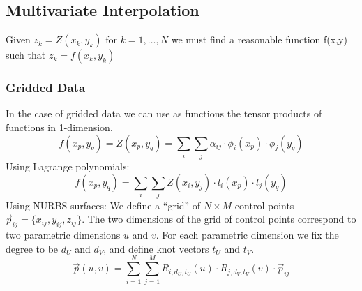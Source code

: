 \documentclass[8pt,a4paper]{scrartcl}
\begin{document}
\begin{multicols*}{3}

\subsection{Multivariate Interpolation}

Given $z_k = Z(x_k,y_k)$ for $k = 1,\dots,N$ we must find a reasonable function f(x,y) such that $z_k = f(x_k,y_k)$

\subsubsection{Gridded Data}

In the case of gridded data we can use as functions the tensor products of functions in 1-dimension.
\begin{equation*}
f(x_p,y_q) = Z(x_p,y_q) = \sum_i \sum_j \alpha_{ij} \cdot \phi_i(x_p) \cdot \phi_j(y_q)
\end{equation*}
Using Lagrange polynomials:
\begin{equation*}
f(x_p,y_q) = \sum_i \sum_j Z(x_i,y_j) \cdot l_i(x_p)\cdot  l_j(y_q)
\end{equation*}
Using NURBS surfaces:
We define a ``grid'' of $N \times M$ control points $\vec p_{ij} = \{x_{ij},y_{ij},z_{ij}\}$. The two dimensions of the grid of control points correspond to two parametric dimensions $u$ and $v$. For each parametric dimension we fix the degree to be $d_U$ and $d_V$, and define knot vectors $t_U$ and $t_V$.
\begin{equation*}
\vec p(u,v) = \sum_{i=1}^N \sum_{j=1}^M R_{i,d_U,t_U}(u) \cdot R_{j,d_V,t_V}(v) \cdot \vec p_{ij}
\end{equation*}


\end{multicols*}
\end{document}
